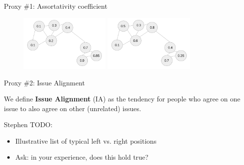 \documentclass[12pt]{beamer}
\begin{document}
\begin{frame}[c]{Proxy \#1: Assortativity coefficient} %





\begin{figure}
	\includegraphics[width=0.40\textwidth]{images/HighAssortDiagram.png}
	\hfill
	\includegraphics[width=0.40\textwidth]{images/LowAssortDiagram.png}
\end{figure}

\end{frame}


\begin{frame}[c]{Proxy \#2: Issue Alignment} %

We define \textbf{Issue Alignment} (IA) as the tendency for people who agree on
one issue to also agree on other (unrelated) issues.

{\tiny \color{red} 
Stephen TODO:

\begin{itemize}
\itemsep.1em
\item Illustrative list of typical left vs. right positions
\item Ask: in your experience, does this hold true?
\end{itemize}
}

\end{frame}
\end{document}
